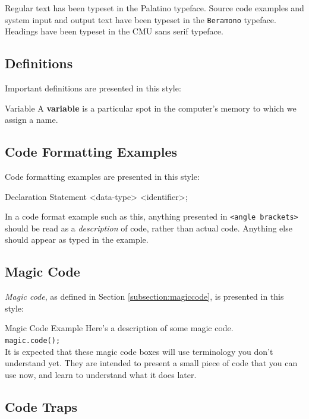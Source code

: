 Regular text has been typeset in the Palatino typeface.  Source code examples and system input and output text have been typeset in the \texttt{Beramono} typeface.  Headings have been typeset in the \textsf{CMU sans serif} typeface.

\subsection*{Definitions}

Important definitions are presented in this style:

\begin{defn*}{Variable}
A \textbf{variable} is a particular spot in the computer's memory to which we assign a name.
\end{defn*}

\subsection*{Code Formatting Examples}

Code formatting examples are presented in this style:

\begin{javaformat*}{Declaration Statement}
<data-type> <identifier>;
\end{javaformat*}

In a code format example such as this, anything presented in \texttt{<angle brackets>} should be read as a \textit{description} of code, rather than actual code.  Anything else should appear as typed in the example.

\subsection*{Magic Code}
\textit{Magic code}, as defined in Section \ref{subsection:magiccode}, is presented in this style:

\begin{magic*}{Magic Code Example}
Here's a description of some magic code.\\

\lstinline{magic.code();}\\

It is expected that these magic code boxes will use terminology you don't understand yet.  They are intended to present a small piece of code that you can use now, and learn to understand what it does later.
\end{magic*}

\subsection*{Code Traps}

